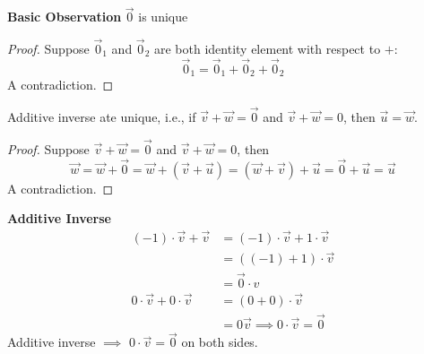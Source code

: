 \textbf{Basic Observation}  
$\vec 0$ is unique 
\begin{proof}
    Suppose $\vec 0_1$ and $\vec 0_2$ are both identity element with respect to $+$:
    \[ \vec 0_1 = \vec 0_1 + \vec 0_2 + \vec 0_2\]
    A contradiction.
\end{proof}
Additive inverse ate unique, i.e., if $\vec v + \vec w = \vec 0$ and $\vec v + \vec w = 0$, then $\vec u = \vec w$. 
\begin{proof}
    Suppose $\vec v + \vec w = \vec 0$ and $\vec v + \vec w = 0$, then
    \[\vec w = \vec w + \vec 0 = \vec w + (\vec v + \vec u) = (\vec w + \vec v) + \vec u = \vec 0 + \vec u = \vec u\]
    A contradiction.
\end{proof}
\noindent \textbf{Additive Inverse} 
\begin{align*}
    (-1) \cdot \vec v + \vec v &= (-1) \cdot \vec v + 1 \cdot \vec v \\
    &= ((-1) + 1) \cdot \vec v \\
    &= \vec 0 \cdot v \\
    0 \cdot \vec v + 0 \cdot \vec v &= (0 + 0) \cdot \vec v \\ &= 0 \vec v \implies \boxed{ 0 \cdot \vec v = \vec 0}
\end{align*} 
Additive inverse $\implies$ $0 \cdot \vec v = \vec 0$ on both sides. 
